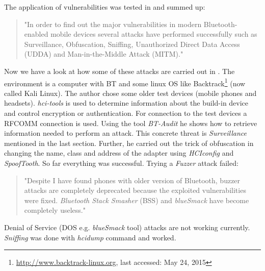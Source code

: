 \documentclass[12pt,a4paper]{article}
\begin{document}
The application of vulnerabilities was tested in \cite{DBLP:journals/corr/abs-1206-1482} and summed up:
\begin{quote}
"In order to find out the major vulnerabilities in modern Bluetooth-enabled mobile devices several attacks have performed successfully such as Surveillance, Obfuscation, Sniffing, Unauthorized Direct Data Access (UDDA) and Man-in-the-Middle Attack (MITM)." \cite{DBLP:journals/corr/abs-1206-1482}
\end{quote} 
Now we have a look at how some of these attacks are carried out in \cite{DBLP:journals/corr/abs-1206-1482}. The environment is a computer with BT and some linux OS like Backtrack\footnote{\url{http://www.backtrack-linux.org}, last accessed: May 24, 2015} (now called Kali Linux). The author chose some older test devices (mobile phones and headsets). \emph{hci-tools} is used to determine information about the build-in device and control encryption or authentication. For connection to the test devices a RFCOMM connection is used. Using the tool \emph{BT-Audit} he shows how to retrieve information needed to perform an attack. This concrete threat is \emph{Surveillance} mentioned in the last section. Further, he carried out the trick of obfuscation in changing the name, class and address of the adapter using \emph{HCIconfig} and \emph{SpoofTooth}. So far everything was successful. Trying a \emph{Fuzzer} attack failed:
\begin{quote}
"Despite I have found phones with older version of Bluetooth, buzzer attacks are completely deprecated because the exploited vulnerabilities were fixed. \emph{Bluetooth Stack Smasher} (BSS) and \emph{blueSmack} have become completely useless." \cite{DBLP:journals/corr/abs-1206-1482}
\end{quote}
Denial of Service (DOS e.g. \emph{blueSmack} tool) attacks are not working currently. \emph{Sniffing} was done with \emph{hcidump} command and worked.
\end{document}
